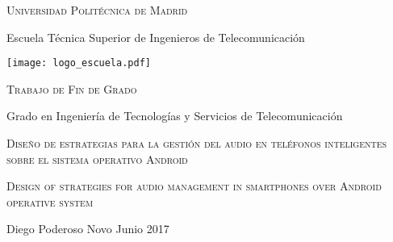 \begin{titlepage}
	\begin{center}
	
		\large {\textsc{\textsf{Universidad Politécnica de Madrid}}}
		
		\bigskip
		\bigskip
		
		\large {\textsf{Escuela Técnica Superior de Ingenieros de Telecomunicación}}
	
		\bigskip
		\bigskip
		\bigskip

		\texttt{[image: logo\_escuela.pdf]}
		
		\bigskip
		\bigskip
		\bigskip
		
		\large {\textsc{\textsf{Trabajo de Fin de Grado}}}
		
		\bigskip
		\bigskip
		\bigskip
		
		\large {\textsf{Grado en Ingeniería de Tecnologías y Servicios de Telecomunicación}}
		
		\bigskip
		\bigskip
		\bigskip
		\bigskip
		\bigskip
		
		\large {\textsc{\textsf{Diseño de estrategias para la gestión del audio en teléfonos inteligentes sobre el sistema operativo Android}}}
		
		\bigskip
		
		\large {\textsc{\textsf{Design of strategies for audio management in smartphones over Android operative system}}}
		
		\bigskip
		\bigskip
		\bigskip
		\bigskip
		
		\large {Diego Poderoso Novo}
		\linebreak
		\large {Junio 2017}
				
	\end{center}
\end{titlepage}
